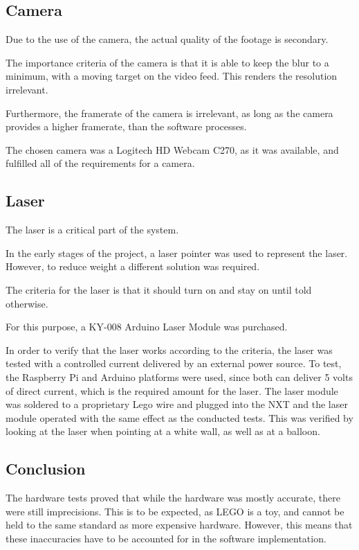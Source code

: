 \subsection*{Camera}
Due to the use of the camera, the actual quality of the footage is secondary.

The importance criteria of the camera is that it is able to keep the blur to a minimum, with a moving target on the video feed.
This renders the resolution irrelevant.

Furthermore, the framerate of the camera is irrelevant, as long as the camera provides a higher framerate, than the software processes.

The chosen camera was a Logitech HD Webcam C270, as it was available, and fulfilled all of the requirements for a camera\cite{logitechwebcam}.

\subsection*{Laser}
The laser is a critical part of the system.

In the early stages of the project, a laser pointer was used to represent the laser.
However, to reduce weight a different solution was required.

The criteria for the laser is that it should turn on and stay on until told otherwise. 

For this purpose, a KY-008 Arduino Laser Module was purchased\cite{LaserDatasheet}.

In order to verify that the laser works according to the criteria, the laser was tested with a controlled current delivered by an external power source.
To test, the Raspberry Pi and Arduino platforms were used, since both can deliver 5 volts of direct current, which is the required amount for the laser\cite{LaserDatasheet}.
The laser module was soldered to a proprietary Lego wire and plugged into the NXT and the laser module operated with the same effect as the conducted tests. 
This was verified by looking at the laser when pointing at a white wall, as well as at a balloon.

\subsection*{Conclusion}
The hardware tests proved that while the hardware was mostly accurate, there were still imprecisions.
This is to be expected, as LEGO is a toy, and cannot be held to the same standard as more expensive hardware.
However, this means that these inaccuracies have to be accounted for in the software implementation.
